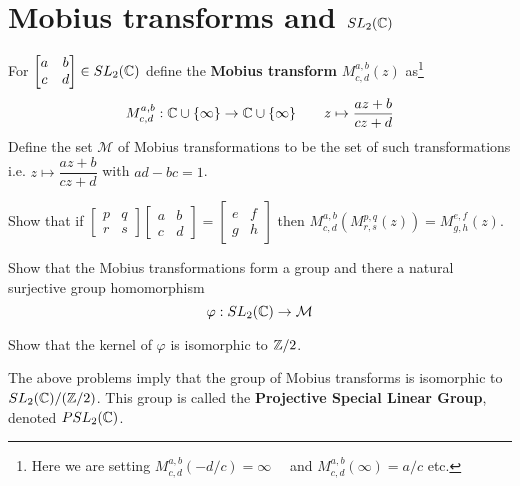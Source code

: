 \newpage
\section{Mobius transforms and $SL_2(\mathbb{C})$}
\begin{definition}
	For $\begin{bmatrix}a & b \\ c & d\end{bmatrix} \in SL_{2}(\mathbb{C})$ define the \textbf{Mobius transform} $M^{a,b}_{c,d}(z)$ as\footnote{Here we are setting $ M^{a,b}_{c,d}(-d/c) = \infty\quad$ and $ M^{a,b}_{c,d}(\infty) = a/c$ etc.}
	\begin{align*}
		M^{a,b}_{c,d}: \mathbb{C} \cup \{ \infty \} \rightarrow \mathbb{C} \cup \{ \infty \} \qquad
		z \mapsto \dfrac{az + b}{cz + d}
	\end{align*}
		Define the set $\mathcal{M}$ of Mobius transformations to be the set of such transformations i.e. $z \mapsto \dfrac{az + b}{cz + d}$ with $ad - bc = 1$.

\end{definition}
\begin{question}
	Show that if $\begin{bmatrix}p & q \\ r & s\end{bmatrix} \begin{bmatrix}a & b \\ c & d\end{bmatrix}  = \begin{bmatrix}e & f \\ g & h\end{bmatrix}$ then $M^{a,b}_{c,d} \left( M^{p,q}_{r,s} (z) \right)= M^{e,f}_{g,h}(z)$.
\end{question}
\begin{question}
	Show that the Mobius transformations form a group and
			there a natural surjective group homomorphism $$ \varphi: SL_2(\mathbb{C}) \rightarrow \mathcal{M}$$
\end{question}

\begin{question}
	Show that the kernel of $\varphi$ is isomorphic to $\mathbb{Z}/2$.
\end{question}
\begin{remark}
	The above problems imply that the group of Mobius transforms is isomorphic to $SL_2(\mathbb{C})/(\mathbb{Z}/2)$. This group is called the \textbf{Projective Special Linear Group}, denoted $PSL_2(\mathbb{C})$.
\end{remark}

